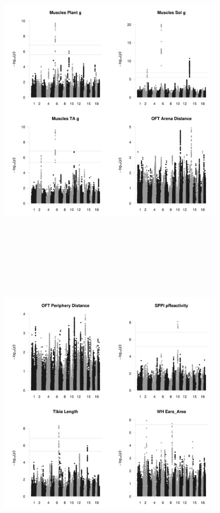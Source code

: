 \documentclass{article}
\begin{document}
\begin{figure}
\begin{center}
\includegraphics[width=15cm, height=15cm]{37.jpeg}
\end{center}
\end{figure}


\begin{figure}
\begin{center}
\includegraphics[width=15cm, height=15cm]{41.jpeg}
\end{center}
\end{figure}
\end{document}
